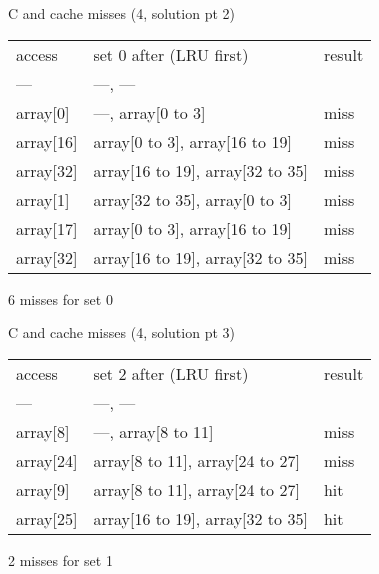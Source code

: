 \begin{frame}[fragile,label=arrayMissesSparse2AltSoln2]{C and cache misses (4, solution pt 2)}
\begin{tabular}{lll}
access & set 0 after (LRU first) & result \\
--- & ---, --- \\
array[0] & ---, array[0 to 3] & miss \\
array[16] & array[0 to 3], array[16 to 19] & miss \\
array[32] & array[16 to 19], array[32 to 35] & miss \\
array[1] & array[32 to 35], array[0 to 3] & miss \\
array[17] & array[0 to 3], array[16 to 19] & miss \\
array[32] & array[16 to 19], array[32 to 35] & miss \\
\end{tabular}
6 misses for set 0
\end{frame}
\begin{frame}[fragile,label=arrayMissesSparse2AltSoln3]{C and cache misses (4, solution pt 3)}
\begin{tabular}{lll}
access & set 2 after (LRU first) & result \\
--- & ---, --- \\
array[8] & ---, array[8 to 11] & miss \\
array[24] & array[8 to 11], array[24 to 27] & miss \\
array[9] & array[8 to 11], array[24 to 27] & hit \\
array[25] & array[16 to 19], array[32 to 35] & hit \\
\end{tabular}
2 misses for set 1
\end{frame}
